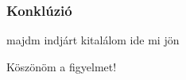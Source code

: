 \documentclass[11pt]{beamer}
\begin{document}
\begin{frame}
	\frametitle{Konklúzió}

	majdm indjárt kitalálom ide mi jön


\end{frame}



\begin{frame}

	\centering
	Köszönöm a figyelmet!

\end{frame}
\end{document}
